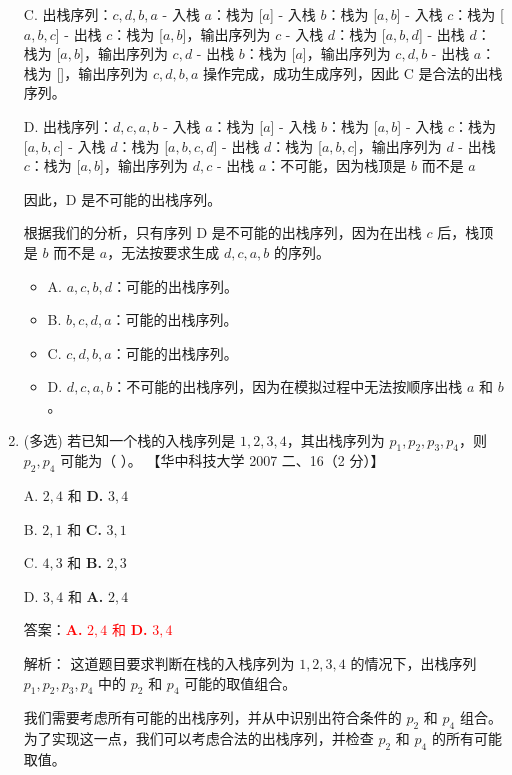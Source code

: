 \documentclass[lang=cn,newtx,10pt,scheme=chinese]{../../../elegantbook}
\begin{document}
\begin{enumerate}
    C. 出栈序列：$c, d, b, a$
       - 入栈 $a$：栈为 [$a$]
       - 入栈 $b$：栈为 [$a, b$]
       - 入栈 $c$：栈为 [$a, b, c$]
       - 出栈 $c$：栈为 [$a, b$]，输出序列为 $c$
       - 入栈 $d$：栈为 [$a, b, d$]
       - 出栈 $d$：栈为 [$a, b$]，输出序列为 $c, d$
       - 出栈 $b$：栈为 [$a$]，输出序列为 $c, d, b$
       - 出栈 $a$：栈为 []，输出序列为 $c, d, b, a$
       操作完成，成功生成序列，因此 C 是合法的出栈序列。

    D. 出栈序列：$d, c, a, b$
       - 入栈 $a$：栈为 [$a$]
       - 入栈 $b$：栈为 [$a, b$]
       - 入栈 $c$：栈为 [$a, b, c$]
       - 入栈 $d$：栈为 [$a, b, c, d$]
       - 出栈 $d$：栈为 [$a, b, c$]，输出序列为 $d$
       - 出栈 $c$：栈为 [$a, b$]，输出序列为 $d, c$
       - 出栈 $a$：不可能，因为栈顶是 $b$ 而不是 $a$

       因此，D 是不可能的出栈序列。

    根据我们的分析，只有序列 D 是不可能的出栈序列，因为在出栈 $c$ 后，栈顶是 $b$ 而不是 $a$，无法按要求生成 $d, c, a, b$ 的序列。

    \begin{itemize}
        \item A. $a,c,b,d$：可能的出栈序列。
        \item B. $b,c,d,a$：可能的出栈序列。
        \item C. $c, d, b, a$：可能的出栈序列。
        \item D. $d, c, a, b$：不可能的出栈序列，因为在模拟过程中无法按顺序出栈 $a$ 和 $b$。
    \end{itemize}

    \item (多选) 若已知一个栈的入栈序列是 $1, 2, 3, 4$，其出栈序列为 $p_1, p_2, p_3, p_4$，则 $p_2, p_4$ 可能为（ ）。  
    【华中科技大学 2007 二、16（2 分）】  

    A. $2, 4$ 和 \textbf{D.} $3, 4$

    B. $2, 1$ 和 \textbf{C.} $3, 1$  

    C. $4, 3$ 和 \textbf{B.} $2, 3$  

    D. $3, 4$ 和 \textbf{A.} $2, 4$  

    答案：\textcolor{red}{\textbf{A.} $2, 4$ 和 \textbf{D.} $3, 4$}

    解析：
    这道题目要求判断在栈的入栈序列为 $1, 2, 3, 4$ 的情况下，出栈序列 $p_1, p_2, p_3, p_4$ 中的 $p_2$ 和 $p_4$ 可能的取值组合。

    我们需要考虑所有可能的出栈序列，并从中识别出符合条件的 $p_2$ 和 $p_4$ 组合。为了实现这一点，我们可以考虑合法的出栈序列，并检查 $p_2$ 和 $p_4$ 的所有可能取值。


\end{enumerate}
\end{document}

